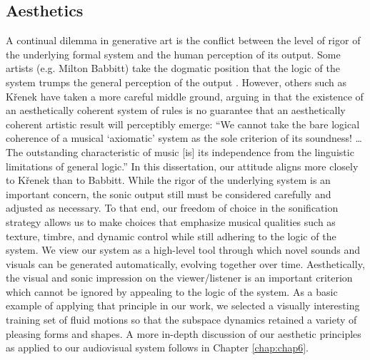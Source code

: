 \subsection{Aesthetics}
A continual dilemma in generative art is the conflict between the level of 
rigor of the underlying formal system and the human perception of its output. 
Some artists (e.g. Milton Babbitt) take the dogmatic position that the logic 
of the system trumps the general perception of the output \cite{babbitt1958cares}.
However, others such as K{\v{r}}enek have taken a more careful middle 
ground, arguing in \cite{kvrenek1939music} that the existence of an aesthetically coherent system of 
rules is no guarantee that an aesthetically coherent artistic result will 
perceptibly emerge: ``We cannot take the bare logical coherence of a musical `axiomatic' system as the sole criterion of its soundness! \dots The 
outstanding characteristic of music [is] its independence from the linguistic 
limitations of general logic.'' In this dissertation, our attitude aligns more closely to K{\v{r}}enek than to Babbitt. While the rigor of the underlying system
is an important concern, the sonic output still must be considered carefully and adjusted as necessary. To that end, our freedom of choice in the sonification
strategy allows us to make choices that emphasize musical qualities such as texture, timbre, and dynamic control while still adhering to the logic of the system. We view
our system as a high-level tool through which novel sounds and visuals can be generated automatically, evolving together over time. Aesthetically, the visual and sonic
impression on the viewer/listener is an important criterion which cannot be ignored by appealing to the logic of the system. As a basic example of applying that principle in our work, we selected a
 visually interesting training set of fluid motions so that the subspace dynamics retained a variety of pleasing forms and shapes. A more in-depth discussion of our aesthetic principles as applied
 to our audiovisual system follows in Chapter \ref{chap:chap6}.
